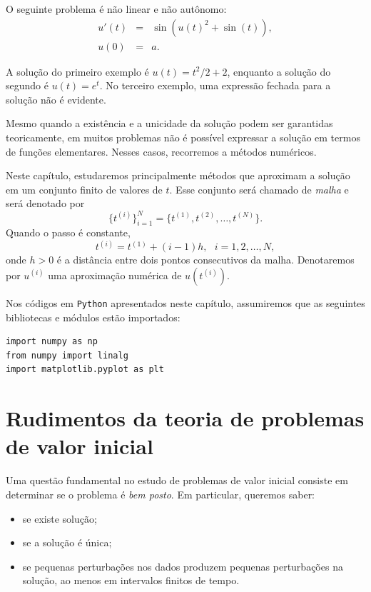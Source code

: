 \begin{ex} O seguinte problema é não linear e não autônomo:
\begin{eqnarray}
   u'(t) &=&\sin(u(t)^2+\sin(t)),\\
   u(0) &=& a.
\end{eqnarray}
\end{ex}

A solução do primeiro exemplo é $u(t)=t^2/2+2$, enquanto a solução do segundo é $u(t)=e^t$. No terceiro exemplo, uma expressão fechada para a solução não é evidente.

Mesmo quando a existência e a unicidade da solução podem ser garantidas teoricamente, em muitos problemas não é possível expressar a solução em termos de funções elementares. Nesses casos, recorremos a métodos numéricos.

Neste capítulo, estudaremos principalmente métodos que aproximam a solução em um conjunto finito de valores de $t$. Esse conjunto será chamado de \emph{malha} e será denotado por
\begin{equation}
 \{t^{(i)}\}_{i=1}^N=\{t^{(1)},t^{(2)},\ldots,t^{(N)}\}.
\end{equation}
Quando o passo é constante,
\begin{equation}
 t^{(i)}=t^{(1)}+(i-1)h,~~~i=1,2,\ldots,N,
\end{equation}
onde $h>0$ é a distância entre dois pontos consecutivos da malha. Denotaremos por $u^{(i)}$ uma aproximação numérica de $u(t^{(i)})$.

\ifispython
Nos códigos em \verb+Python+ apresentados neste capítulo, assumiremos que as seguintes bibliotecas e módulos estão importados:
\begin{verbatim}
import numpy as np
from numpy import linalg
import matplotlib.pyplot as plt
\end{verbatim}
\fi

\section{Rudimentos da teoria de problemas de valor inicial}
Uma questão fundamental no estudo de problemas de valor inicial consiste em determinar se o problema é \emph{bem posto}. Em particular, queremos saber:
\begin{itemize}
 \item se existe solução;
 \item se a solução é única;
 \item se pequenas perturbações nos dados produzem pequenas perturbações na solução, ao menos em intervalos finitos de tempo.
\end{itemize}

